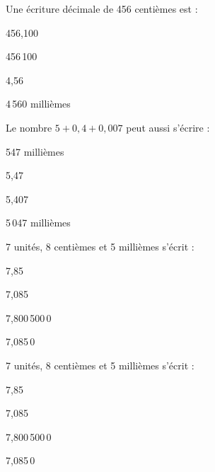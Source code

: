 \begin{QCM}
\begin{GroupeQCM}
    \begin{exercice}
      Une écriture décimale de 456 centièmes est :
      \begin{ChoixQCM}{4}
      \item 456,100
      \item 456\,100
      \item 4,56
      \item 4\,560 millièmes
      \end{ChoixQCM}
      \begin{corrige}
   \end{corrige}
    \end{exercice}


    \begin{exercice}
      Le nombre $5 + 0,4 + 0,007$ peut aussi s'écrire :
      \begin{ChoixQCM}{4}
      \item 547 millièmes
      \item 5,47
      \item 5,407
      \item 5\,047 millièmes
      \end{ChoixQCM}
      \begin{corrige}
   \end{corrige}
    \end{exercice}
    
        \begin{exercice}
      7 unités, 8 centièmes et 5 millièmes s'écrit :
      \begin{ChoixQCM}{4}
      \item 7,85
      \item 7,085
      \item 7,800\,500\,0
      \item 7,085\,0
      \end{ChoixQCM}
      \begin{corrige}
   \end{corrige}
    \end{exercice}

        \begin{exercice}
      7 unités, 8 centièmes et 5 millièmes s'écrit :
      \begin{ChoixQCM}{4}
      \item 7,85
      \item 7,085
      \item 7,800\,500\,0
      \item 7,085\,0
      \end{ChoixQCM}
      \begin{corrige}
   \end{corrige}
    \end{exercice}


\end{GroupeQCM}
\end{QCM}
